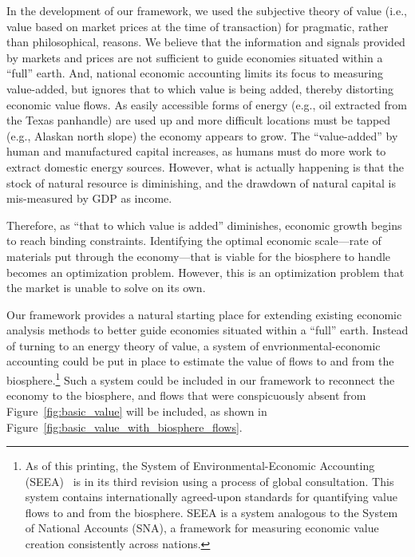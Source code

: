 In the development of our framework, we used the subjective theory of value 
(i.e., value based on market prices at the time of transaction) 
for pragmatic, rather than philosophical, reasons.
We believe that the information and signals provided by markets and prices 
are not sufficient to guide economies situated within a ``full'' earth.
And, national economic accounting limits its focus to measuring value-added, 
but ignores that to which value is being added,
thereby distorting economic value flows. 
As easily accessible forms of energy (e.g.,  oil extracted from the Texas panhandle) 
are used up and more difficult locations must be tapped (e.g., Alaskan north slope) 
the economy appears to grow.
The ``value-added'' by human and manufactured capital increases, 
as humans must do more work to extract domestic energy sources. 
However, what is actually happening is that the stock 
of natural resource is diminishing, 
and the drawdown of natural capital is mis-measured by GDP as income.\cite[pp.~66~and~75]{Daly1997}

Therefore, as ``that to which value is added'' diminishes, 
economic growth begins to reach binding constraints. 
Identifying the optimal economic 
scale---rate of materials put through the economy---that 
is viable for the biosphere to handle becomes an optimization problem. 
However, this is an optimization 
problem that the market is unable to solve on its own. 

Our framework provides a natural starting place for extending 
existing economic analysis methods to better
guide economies situated within a ``full'' earth. 
Instead of turning to an energy theory of value,
a system of envrionmental-economic accounting 
could be put in place to estimate the value 
of flows to and from the biosphere.\footnote{As of this printing, 
	the System of Environmental-Economic Accounting (SEEA)~\cite{UNSEEA:aa}
	is in its third revision 
	using a process of global consultation. 
	This system contains internationally agreed-upon standards for quantifying value flows 
	to and from the biosphere. 
	SEEA is a system analogous to the System of National Accounts (SNA), 
	a framework for measuring economic value creation consistently across nations.} 
Such a system could be included in our framework
to reconnect the economy to the biosphere, 
and flows that were conspicuously 
absent from Figure~\ref{fig:basic_value} will
be included, as shown in Figure~\ref{fig:basic_value_with_biosphere_flows}.

